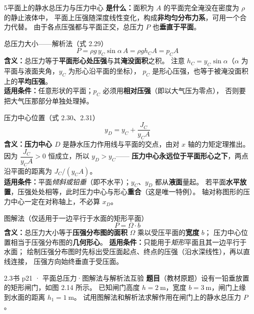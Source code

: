 \begin{kaodian}{5}{平面上的静水总压力与压力中心}
\textbf{是什么：}面积为 $A$ 的平面完全淹没在密度为 $\rho$ 的静止液体中，
平面上压强随深度线性变化，构成\textbf{非均匀分布力系}，可用一个合力代替。
由于各点压强都与平面正交，总压力 $P$ 也\textbf{垂直于平面}。

\begin{gongshi}{总压力大小——解析法（式 2.29）}
\[ P=\rho g\,y_C\sin\alpha\,A=\rho g h_C A=p_C A \]
\textbf{含义：}总压力等于\textbf{平面形心处压强}与其\textbf{淹没面积}之积。
注意 $h_C=y_C\sin\alpha$（$\alpha$ 为平面与液面夹角，$y_C$ 为形心沿平面的坐标），
$p_C$ 是形心压强，也等于被淹没面积上的\textbf{平均压强}。\\
\textbf{适用条件：}任意形状的平面；$p_C$ 必须用\textbf{相对压强}（即以大气压为零点），
否则要把大气压那部分单独处理掉。
\end{gongshi}

\begin{gongshi}{压力中心位置（式 2.30、2.31）}
\[ y_D=y_C+\frac{J_C}{y_C A} \]
\textbf{含义：}\textbf{压力中心 $D$} 是静水压力作用线与平面的交点，由对 $x$ 轴的力矩定理推出。
因为 $\dfrac{J_C}{y_C A}>0$ 恒成立，所以 $y_D>y_C$——
\textbf{压力中心永远位于平面形心之下}，两点沿平面的距离为 $J_C/(y_C A)$。\\
\textbf{适用条件：}平面\emph{倾斜或铅垂}（即不水平）；$y_C$、$y_D$ 都从\textbf{液面}量起。
若平面\textbf{水平放置}，压强处处相等，此时压力中心与形心\textbf{重合}（这是唯一特例）。
轴对称图形的压力中心一定在对称轴上，不必算 $x_D$。
\end{gongshi}

\begin{gongshi}{图解法（仅适用于一边平行于水面的矩形平面）}
\[ P=\Omega\cdot b \]
\textbf{含义：}总压力大小等于\textbf{压强分布图的面积} $\Omega$ 乘以受压平面的\textbf{宽度} $b$；
压力中心位置相当于压强分布图的\textbf{几何形心}。
\textbf{适用条件：}只能用于\emph{矩形}平面且其一边平行于水面；
绘制压强分布图时先标出受压面起点、终点的压强（沿水深线性），再以直线连接，
压强方向始终垂直于受压面。
\end{gongshi}

\begin{liti}{2.3}{书 p21 · 平面总压力·图解法与解析法互验}
\textbf{题目}（教材原题）设有一铅垂放置的矩形闸门，如图 2.14 所示。
已知闸门高度 $h=2\ \mathrm{m}$，宽度 $b=3\ \mathrm{m}$，闸门上缘到水面的距离 $h_1=1\ \mathrm{m}$。
试用图解法和解析法求解作用在闸门上的静水总压力 $P$。


\end{liti}
\end{kaodian}
